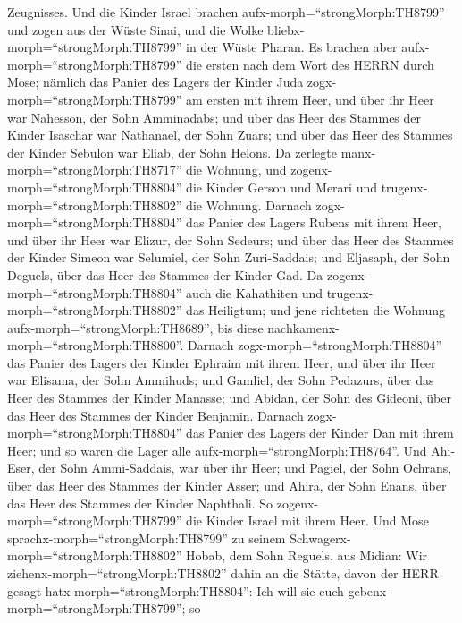 Zeugnisses.  Und die Kinder Israel brachen
aufx-morph=``strongMorph:TH8799'' und zogen aus der Wüste Sinai, und die
Wolke bliebx-morph=``strongMorph:TH8799'' in der Wüste Pharan.
 Es brachen aber aufx-morph=``strongMorph:TH8799'' die
ersten nach dem Wort des HERRN durch Mose;  nämlich das
Panier des Lagers der Kinder Juda zogx-morph=``strongMorph:TH8799'' am
ersten mit ihrem Heer, und über ihr Heer war Nahesson, der Sohn
Amminadabs;  und über das Heer des Stammes der Kinder
Isaschar war Nathanael, der Sohn Zuars;  und über das Heer
des Stammes der Kinder Sebulon war Eliab, der Sohn Helons. 
Da zerlegte manx-morph=``strongMorph:TH8717'' die Wohnung, und
zogenx-morph=``strongMorph:TH8804'' die Kinder Gerson und Merari und
trugenx-morph=``strongMorph:TH8802'' die Wohnung.  Darnach
zogx-morph=``strongMorph:TH8804'' das Panier des Lagers Rubens mit ihrem
Heer, und über ihr Heer war Elizur, der Sohn Sedeurs;  und
über das Heer des Stammes der Kinder Simeon war Selumiel, der Sohn
Zuri-Saddais;  und Eljasaph, der Sohn Deguels, über das
Heer des Stammes der Kinder Gad.  Da
zogenx-morph=``strongMorph:TH8804'' auch die Kahathiten und
trugenx-morph=``strongMorph:TH8802'' das Heiligtum; und jene richteten
die Wohnung aufx-morph=``strongMorph:TH8689'', bis diese
nachkamenx-morph=``strongMorph:TH8800''.  Darnach
zogx-morph=``strongMorph:TH8804'' das Panier des Lagers der Kinder
Ephraim mit ihrem Heer, und über ihr Heer war Elisama, der Sohn
Ammihuds;  und Gamliel, der Sohn Pedazurs, über das Heer
des Stammes der Kinder Manasse;  und Abidan, der Sohn des
Gideoni, über das Heer des Stammes der Kinder Benjamin. 
Darnach zogx-morph=``strongMorph:TH8804'' das Panier des Lagers der
Kinder Dan mit ihrem Heer; und so waren die Lager alle
aufx-morph=``strongMorph:TH8764''. Und Ahi-Eser, der Sohn Ammi-Saddais,
war über ihr Heer;  und Pagiel, der Sohn Ochrans, über das
Heer des Stammes der Kinder Asser;  und Ahira, der Sohn
Enans, über das Heer des Stammes der Kinder Naphthali.  So
zogenx-morph=``strongMorph:TH8799'' die Kinder Israel mit ihrem Heer.
 Und Mose sprachx-morph=``strongMorph:TH8799'' zu seinem
Schwagerx-morph=``strongMorph:TH8802'' Hobab, dem Sohn Reguels, aus
Midian: Wir ziehenx-morph=``strongMorph:TH8802'' dahin an die Stätte,
davon der HERR gesagt hatx-morph=``strongMorph:TH8804'': Ich will sie
euch gebenx-morph=``strongMorph:TH8799''; so
